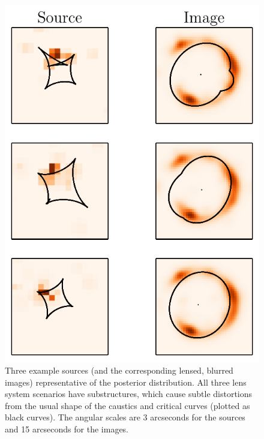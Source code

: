 \documentclass[useAMS,usenatbib]{mn2e}
\begin{document}
\begin{figure}
\begin{center}
\includegraphics[scale=0.8]{sources.pdf}
\caption{Three example sources (and the corresponding lensed, blurred images)
representative of the posterior distribution. All three lens system scenarios
have substructures, which cause subtle distortions from the usual shape of
the caustics and critical curves (plotted as black curves).
The angular scales are 3 arcseconds for the sources and 15
arcseconds for the images.
\label{fig:sources}}
\end{center}
\end{figure}
\end{document}
